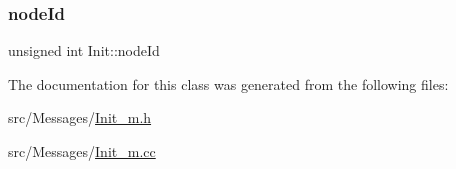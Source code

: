 \subsubsection{\texorpdfstring{node\+Id}{nodeId}}
{\footnotesize\ttfamily unsigned int Init\+::node\+Id\hspace{0.3cm}{\ttfamily [protected]}}



The documentation for this class was generated from the following files\+:\begin{DoxyCompactItemize}
\item 
src/\+Messages/\hyperlink{_init__m_8h}{Init\+\_\+m.\+h}\item 
src/\+Messages/\hyperlink{_init__m_8cc}{Init\+\_\+m.\+cc}\end{DoxyCompactItemize}

